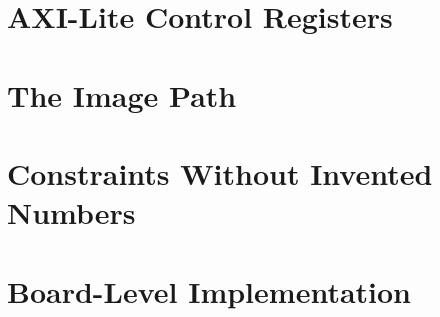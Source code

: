 \section{AXI-Lite Control Registers}
\label{sec:csr}

\section{The Image Path}
\label{sec:image-path}

\section{Constraints Without Invented Numbers}
\label{sec:xdc}

\section{Board-Level Implementation}
\label{sec:board-impl}
%

